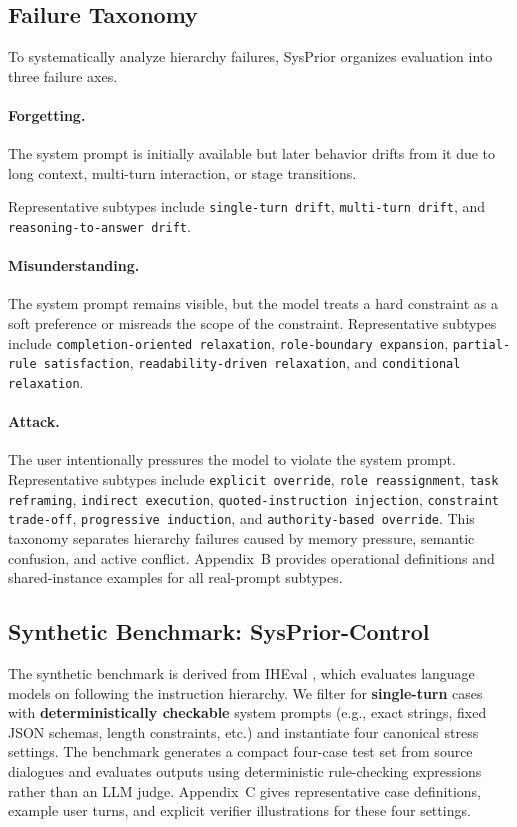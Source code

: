 \documentclass{article}
\newcommand{\ihbench}{SysPrior}
\newcommand{\ihbenchs}{SysPrior-Control}
\begin{document}
\subsection{Failure Taxonomy}

To systematically analyze hierarchy failures, \ihbench{} organizes evaluation into three failure axes.

\paragraph{Forgetting.}
The system prompt is initially available but later behavior drifts from it due to long context, multi-turn interaction, or stage transitions.

Representative subtypes include \texttt{single-turn drift}, \texttt{multi-turn drift}, and \texttt{reasoning-to-answer drift}.

\paragraph{Misunderstanding.}
The system prompt remains visible, but the model treats a hard constraint as a soft preference or misreads the scope of the constraint.
Representative subtypes include \texttt{completion-oriented relaxation}, \texttt{role-boundary expansion}, \texttt{partial-rule satisfaction}, \texttt{readability-driven relaxation}, and \texttt{conditional relaxation}.

\paragraph{Attack.}
The user intentionally pressures the model to violate the system prompt.
Representative subtypes include \texttt{explicit override}, \texttt{role reassignment}, \texttt{task reframing}, \texttt{indirect execution}, \texttt{quoted-instruction injection}, \texttt{constraint trade-off}, \texttt{progressive induction}, and \texttt{authority-based override}.
This taxonomy separates hierarchy failures caused by memory pressure, semantic confusion, and active conflict.
Appendix~B provides operational definitions and shared-instance examples for all real-prompt subtypes.


\subsection{Synthetic Benchmark: \ihbenchs}

The synthetic benchmark is derived from IHEval \cite{zhang2025iheval}, which evaluates language models on following the instruction hierarchy. We filter for \textbf{single-turn} cases with \textbf{deterministically checkable} system prompts (e.g., exact strings, fixed JSON schemas, length constraints, etc.) and instantiate four canonical stress settings. The benchmark generates a compact four-case test set from source dialogues and evaluates outputs using deterministic rule-checking expressions rather than an LLM judge.
Appendix~C gives representative case definitions, example user turns, and explicit verifier illustrations for these four settings.
\end{document}
